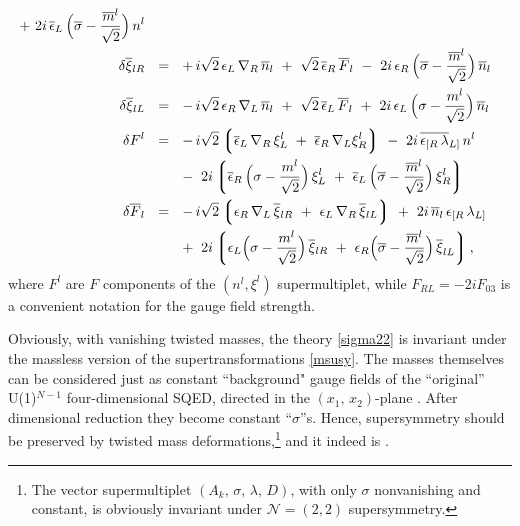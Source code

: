 \documentclass[12pt]{article}
\newcommand{\ntwot}{${\mathcal N}= \left(2,2\right) $ }
\newcommand{\ov}{\overline}
\newcommand{\lgr}{\left\lgroup}
\newcommand{\rgr}{\right\rgroup}
\newcommand{\eer}{\epsilon_R}
\newcommand{\eel}{\epsilon_L}
\newcommand{\beer}{\ov{\epsilon}{}_R}
\newcommand{\beel}{\ov{\epsilon}{}_L}
\begin{document}
\begin{align}
     ~+~ 2i\, \beel\, \Bigl(\ov{\sigma} - \frac{\ov{m}{}^l}{\sqrt{2}}\Bigr)\, n^l
     \\
%
\notag
  \delta\ov{\xi}{}_{lR} & ~~=~~
     +\, i\sqrt{2}\, \eel\, \nabla_R\, \ov{n}{}_l 
     ~+~ \sqrt{2}\, \beer\, \ov{F}{}_l 
     ~-~ 2i\, \eer\, \Bigl(\ov{\sigma} - \frac{\ov{m}{}^l}{\sqrt{2}}\Bigr)\, \ov{n}{}_l
     \\
%
\notag
  \delta\ov{\xi}{}_{lL} & ~~=~~
     -\, i\sqrt{2}\, \eer\, \nabla_L\, \ov{n}{}_l
     ~+~ \sqrt{2}\, \beel\, \ov{F}{}_l
     ~+~ 2i\, \eel\, \Bigl(\sigma - \frac{m^l}{\sqrt{2}}\Bigr)\, \ov{n}{}_l
     \\
%
\notag
  \delta F^l & ~~=~~
     -\,i\sqrt{2} \lgr \beel\, \nabla_R\, \xi_L^l ~+~ \beer\, \nabla_L \xi_R^l \rgr
     ~-~ 2i\, \ov{\epsilon_{[R}\, \lambda}{}_{L]}\, n^l
     \\
\notag
     & \phantom{~~=~~}
     ~-~ 2i \lgr \beer\, \Bigl(\sigma - \frac{m^l}{\sqrt{2}}\Bigr)\, \xi_L^l 
             ~+~ \beel\, \Bigl(\ov{\sigma} - \frac{\ov{m}{}^l}{\sqrt{2}}\Bigr)\, \xi_R^l \rgr 
     \\
%
\notag
  \delta \ov{F}{}_l & ~~=~~
     -\,i\sqrt{2} \lgr \eer\, \nabla_L\, \ov{\xi}{}_{lR} ~+~ 
                       \eel\, \nabla_R\, \ov{\xi}{}_{lL} \rgr
     ~+~ 2i\,\ov{n}{}_l\, \epsilon_{[R}\, \lambda_{L]} 
     \\
\notag
     & \phantom{~~=~~}
     ~+~ 2i \lgr \eel \Bigl(\sigma - \frac{m^l}{\sqrt{2}}\Bigr)\, \ov{\xi}{}_{lR} 
             ~+~ \eer \Bigl(\ov{\sigma} - \frac{\ov{m}{}^l}{\sqrt{2}}\Bigr)\, 
                            \ov{\xi}_{lL} \rgr ,
\end{align}
where $F^l$ are $F$ components of the $(n^l,\xi^l)$
supermultiplet, while $F_{RL}=-2i F_{03}$ is a
convenient notation for the gauge field
strength.

	Obviously, with vanishing twisted masses, the theory \eqref{sigma22} is invariant
	under the massless version of the supertransformations \eqref{msusy}.
	The masses themselves can be considered just as constant ``background"
	gauge fields of
	the ``original'' U(1)$^{N-1}$  
	four-dimensional SQED, directed in the $ (x_1,\, x_2) $-plane \cite{HaHo,Dorey}.
	After dimensional reduction they become constant ``$\sigma$''s.
	Hence, supersymmetry should be preserved by twisted mass deformations,\footnote{
The vector supermultiplet $(A_k,\,\sigma,\,\lambda,\,D)$, with only 
          $ \sigma $ nonvanishing and constant, is obviously invariant under \ntwot supersymmetry.}
	and it indeed is \cite{twisted}.
\end{document}
